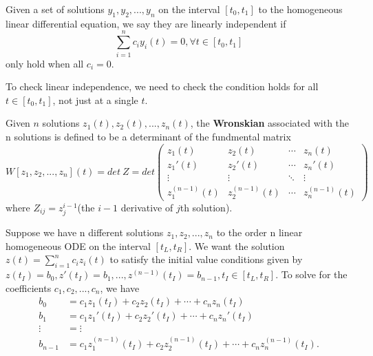 \begin{refsection}
\begin{definition}\cite[40]{luenberger1979introduction}
	Given a set of solutions $y_1,y_2,...,y_n$ on the interval $[t_0,t_1]$  to the homogeneous linear differential equation, we say they are linearly independent if
	$$\sum_{i=1}^n c_i y_i(t) = 0, \forall t\in[t_0,t_1]$$
	only hold when all $c_i = 0$. 
\end{definition}

\begin{remark}
	To check linear independence, we need to check the condition holds for all $t \in  [t_0,t_1]$, not just at a single $t$.
\end{remark}





\begin{definition}
Given $n$ solutions $z_1(t),z_2(t),...,z_n(t)$, the \textbf{Wronskian} associated with the n solutions is defined to be a determinant of the fundmental matrix 
$$W[z_1,z_2,...,z_n](t) = det~Z = det \begin{pmatrix}
z_1(t) & z_2(t) & \cdots & z_n(t)\\ 
z_1'(t) & z_2'(t) & \cdots & z_n'(t)\\ 
\vdots & \vdots & \ddots & \vdots\\ 
z_1^{(n-1)}(t) & z_2^{(n-1)}(t) & \cdots & z_n^{(n-1)}(t)
\end{pmatrix}$$
where $Z_{ij} = z_j^{i-1}$(the $i-1$ derivative of $j$th solution).
\end{definition}

\begin{note}
Suppose we have n different solutions $z_1,z_2,...,z_n$ to the order n linear homogeneous ODE on the interval $[t_L,t_R]$. We want the solution $z(t) = \sum_{i=1}^{n} c_iz_i(t)$ to satisfy the initial value conditions given by
$z(t_I) = b_0, z'(t_I) = b_1,...,z^{(n-1)}(t_I) = b_{n-1},t_I\in [t_L,t_R]$. 
To solve for the coefficients $c_1,c_2,...,c_n$, we have	
	\begin{align*}
	b_0 &= c_1z_1(t_I) + c_2z_2(t_I) + \cdots + c_nz_n(t_I) \\
	b_1 &= c_1z_1'(t_I) + c_2z_2'(t_I) + \cdots + c_nz_n'(t_I) \\
	\vdots &= \vdots\\
	b_{n-1} &= c_1z_1^{(n-1)}(t_I) + c_2z_2^{(n-1)}(t_I) + \cdots + c_nz_n^{(n-1)}(t_I). 
	\end{align*}


\end{note}
\end{refsection}
